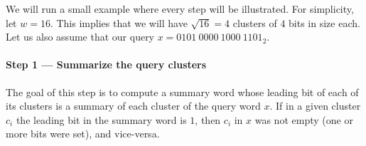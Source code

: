 We will run a small example where every step will be illustrated. For simplicity, let $w=16$. This implies that we will have $\sqrt{16} = 4$ clusters of $4$ bits in size each. Let us also assume that our query $x = 0101\ 0000\ 1000\ 1101_2$.

\paragraph{Step 1 --- Summarize the query clusters} \label{sec:summaryClusters}

The goal of this step is to compute a summary word whose leading bit of each of its clusters is a summary of each cluster of the query word $x$. If in a given cluster $c_i$ the leading bit in the summary word is $1$, then $c_i$ in $x$ was not empty (one or more bits were set), and vice-versa.


